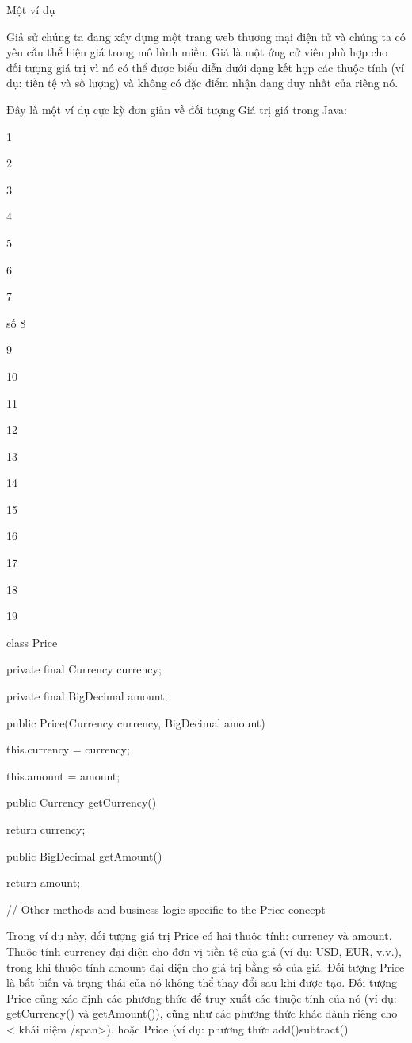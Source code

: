 Một ví dụ

Giả sử chúng ta đang xây dựng một trang web thương mại điện tử và chúng ta có yêu cầu thể hiện giá trong mô hình miền. Giá là một ứng cử viên phù hợp cho đối tượng giá trị vì nó có thể được biểu diễn dưới dạng kết hợp các thuộc tính (ví dụ: tiền tệ và số lượng) và không có đặc điểm nhận dạng duy nhất của riêng nó.

Đây là một ví dụ cực kỳ đơn giản về đối tượng Giá trị giá trong Java:

1

2

3

4

5

6

7

số 8

9

10

11

12

13

14

15

16

17

18

19

class Price {

        private final Currency currency;

        private final BigDecimal amount;

        public Price(Currency currency, BigDecimal amount) {

                this.currency = currency;

                this.amount = amount;

            }

        public Currency getCurrency() {

                return currency;

            }

        public BigDecimal getAmount() {

                return amount;

            }

        // Other methods and business logic specific to the Price concept

    }

Trong ví dụ này, đối tượng giá trị Price có hai thuộc tính: currency và amount. Thuộc tính currency đại diện cho đơn vị tiền tệ của giá (ví dụ: USD, EUR, v.v.), trong khi thuộc tính amount đại diện cho giá trị bằng số của giá. Đối tượng Price là bất biến và trạng thái của nó không thể thay đổi sau khi được tạo. Đối tượng Price cũng xác định các phương thức để truy xuất các thuộc tính của nó (ví dụ: getCurrency() và getAmount()), cũng như các phương thức khác dành riêng cho < khái niệm /span>). hoặc Price (ví dụ: phương thức add()subtract()

